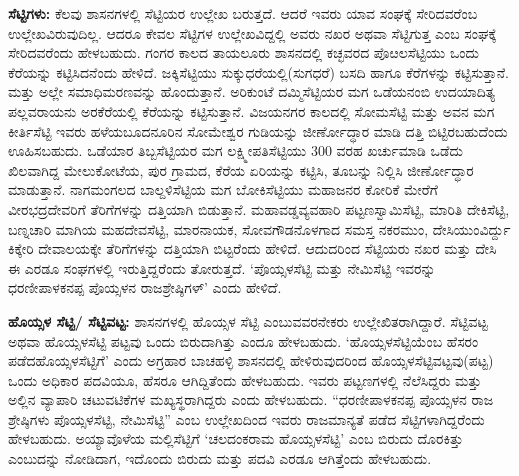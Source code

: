 \textbf{ಸೆಟ್ಟಿಗಳು:} ಕೆಲವು ಶಾಸನಗಳಲ್ಲಿ ಸೆಟ್ಟಿಯರ ಉಲ್ಲೇಖ ಬರುತ್ತದೆ. ಆದರೆ ಇವರು ಯಾವ ಸಂಘಕ್ಕೆ ಸೇರಿದವರೆಂಬ ಉಲ್ಲೇಖವಿರುವುದಿಲ್ಲ. ಆದರೂ ಕೇವಲ ಸೆಟ್ಟಿಗಳ ಉಲ್ಲೇಖವಿದ್ದಲ್ಲಿ ಅವರು ನಖರ ಅಥವಾ ಸೆಟ್ಟಿಗುತ್ತ ಎಂಬ ಸಂಘಕ್ಕೆ ಸೇರಿದವರೆಂದು ಹೇಳಬಹುದು. ಗಂಗರ ಕಾಲದ ತಾಯಲೂರು ಶಾಸನದಲ್ಲಿ ಕಚ್ಛವರದ ಪೊೞಲಸೆಟ್ಟಿಯು ಒಂದು ಕೆರೆಯನ್ನು ಕಟ್ಟಿಸಿದನೆಂದು ಹೇಳಿದೆ. ಜಕ್ಕಿಸೆಟ್ಟಿಯು ಸುಕ್ಕುಧರೆಯಲ್ಲಿ(ಸುಗಧರೆ) ಬಸದಿ ಹಾಗೂ ಕೆರೆಗಳನ್ನು ಕಟ್ಟಿಸುತ್ತಾನೆ. ಮತ್ತು ಅಲ್ಲೇ ಸಮಾಧಿಮರಣವನ್ನು ಹೊಂದುತ್ತಾನೆ. ಅರಿಕುಂಟೆ ದಮ್ಮಿಸೆಟ್ಟಿಯರ ಮಗ ಒಡೆಯನಂಬಿ ಉದಯಾದಿತ್ಯ ಪಲ್ಲವರಾಯನು ಅರಕೆರೆಯಲ್ಲಿ ಕೆರೆಯನ್ನು ಕಟ್ಟಿಸುತ್ತಾನೆ. ವಿಜಯನಗರ ಕಾಲದಲ್ಲಿ ಸೋಮಸೆಟ್ಟಿ ಮತ್ತು ಅವನ ಮಗ ಕೀರ್ತಿಸೆಟ್ಟಿ ಇವರು ಹಳೆಯಬೂದನೂರಿನ ಸೋಮೇಶ್ವರ ಗುಡಿಯನ್ನು ಜೀರ್ಣೋದ್ಧಾರ ಮಾಡಿ ದತ್ತಿ ಬಿಟ್ಟಿರಬಹುದೆಂದು ಊಹಿಸಬಹುದು. ಒಡೆಯಾರ ತಿಬ್ಬಸೆಟ್ಟಿಯರ ಮಗ ಲಕ್ಷ್ಮೀಪತಿಸೆಟ್ಟಿಯು 300 ವರಹ ಖರ್ಚುಮಾಡಿ ಒಡೆದು ಖಿಲವಾಗಿದ್ದ ಮೇಲುಕೋಟೆಯ, ಪುರ ಗ್ರಾಮದ, ಕೆರೆಯ ಏರಿಯನ್ನು ಕಟ್ಟಿಸಿ, ತೂಬನ್ನು ನಿಲ್ಲಿಸಿ ಜೀರ್ಣೋದ್ಧಾರ ಮಾಡುತ್ತಾನೆ. ನಾಗಮಂಗಲದ ಬಾಲ್ದಳಿಸೆಟ್ಟಿಯ ಮಗ ಬೋಕಿಸೆಟ್ಟಿಯು ಮಹಾಜನರ ಕೋರಿಕೆ ಮೇರೆಗೆ ವೀರಭದ್ರದೇವರಿಗೆ ತೆರಿಗೆಗಳನ್ನು ದತ್ತಿಯಾಗಿ ಬಿಡುತ್ತಾನೆ. ಮಹಾವಡ್ಡವ್ಯವಹಾರಿ ಪಟ್ಟಣಸ್ವಾಮಿಸೆಟ್ಟಿ, ಮಾರಿತಿ ದೇಕಿಸೆಟ್ಟಿ, ಬಣ್ನಚಾರಿ ಮಾಗಿಯ ಮಹದೇವಸೆಟ್ಟಿ, ಮಾರನಾಯಕ, ಸೋವಗೌಡನೊಳಗಾದ ಸಮಸ್ತ ನಕರಮುಂ, ದೇಸಿಯುಂವಿರ್ದ್ದು ಕಿಕ್ಕೇರಿ ದೇವಾಲಯಕ್ಕೇ ತೆರಿಗೆಗಳನ್ನು ದತ್ತಿಯಾಗಿ ಬಿಟ್ಟರೆಂದು ಹೇಳಿದೆ. ಆದುದರಿಂದ ಸೆಟ್ಟಿಯರು ನಖರ ಮತ್ತು ದೇಸಿ ಈ ಎರಡೂ ಸಂಘಗಳಲ್ಲಿ ಇರುತ್ತಿದ್ದರೆಂದು ತೋರುತ್ತದೆ. ‘ಪೊಯ್ಸಳಸೆಟ್ಟಿ ಮತ್ತು ನೇಮಿಸೆಟ್ಟಿ ಇವರನ್ನು ಧರಣೀಪಾಳಕನಪ್ಪ ಪೊಯ್ಸಳನ ರಾಜಶ್ರೇಷ್ಠಿಗಳ್​’ ಎಂದು ಹೇಳಿದೆ.

\textbf{ಹೊಯ್ಸಳ ಸೆಟ್ಟಿ/ ಸೆಟ್ಟಿವಟ್ಟ: } ಶಾಸನಗಳಲ್ಲಿ ಹೊಯ್ಸಳ ಸೆಟ್ಟಿ ಎಂಬುವವರನೇಕರು ಉಲ್ಲೇಖಿತರಾಗಿದ್ದಾರೆ. ಸೆಟ್ಟಿವಟ್ಟ ಅಥವಾ ಹೊಯ್ಸಳಸೆಟ್ಟಿ ಪಟ್ಟವು ಒಂದು ಬಿರುದಾಗಿತ್ತು ಎಂದೂ ಹೇಳಬಹುದು. ‘ಹೊಯ್ಸಳಸೆಟ್ಟಿಯೆಂಬ ಹೆಸರಂ ಪಡೆದ\break ಹೊಯ್ಸಳಸೆಟ್ಟಿಗೆ’ ಎಂದು ಅಗ್ರಹಾರ ಬಾಚಹಳ್ಳಿ ಶಾಸನದಲ್ಲಿ ಹೇಳಿರುವುದರಿಂದ ಹೊಯ್ಸಳಸೆಟ್ಟಿವಟ್ಟವು(ಪಟ್ಟ) ಒಂದು ಅಧಿಕಾರ ಪದವಿಯೂ, ಹೆಸರೂ ಆಗಿದ್ದಿತೆಂದು ಹೇಳಬಹುದು. ಇವರು ಪಟ್ಟಣಗಳಲ್ಲಿ ನೆಲೆಸಿದ್ದರು ಮತ್ತು ಅಲ್ಲಿನ ವ್ಯಾಪಾರಿ ಚಟುವಟಿಕೆಗಳ ಮಖ್ಯಸ್ಥರಾಗಿದ್ದರು ಎಂದು ಹೇಳಬಹುದು. “ಧರಣೀಪಾಳಕನಪ್ಪ ಪೊಯ್ಸಳನ ರಾಜ ಶ್ರೇಷ್ಠಿಗಳು ಪೊಯ್ಸಳಸೆಟ್ಟಿ, ನೇಮಿಸೆಟ್ಟಿ” ಎಂಬ ಉಲ್ಲೇಖದಿಂದ ಇವರು ರಾಜಮಾನ್ಯತೆ ಪಡೆದ ಸೆಟ್ಟಿಗಳಾಗಿದ್ದರೆಂದು ಹೇಳಬಹುದು. ಅಯ್ಯಾವೊಳೆಯ ಮಲ್ಲಿಸೆಟ್ಟಿಗೆ ‘ಚಲದಂಕರಾಮ ಹೊಯ್ಸಳಸೆಟ್ಟಿ’ ಎಂಬ ಬಿರುದು ದೊರಕಿತ್ತು ಎಂಬುದನ್ನು ನೋಡಿದಾಗ, ಇದೊಂದು ಬಿರುದು ಮತ್ತು ಪದವಿ ಎರಡೂ ಆಗಿತ್ತೆಂದು ಹೇಳಬಹುದು.

